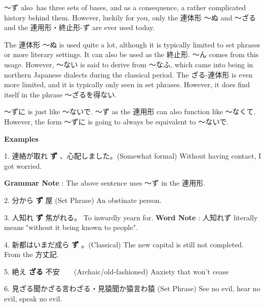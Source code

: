 \par{  ～ず also has three sets of bases, and as a consequence, a rather complicated history behind them. However, luckily for you, only the 連体形 ～ぬ and ～ざる and the 連用形・終止形-ず are ever used today. }

\par{ The 連体形 ～ぬ is used quite a lot, although it is typically limited to set phrases or more literary settings. It can also be used as the 終止形. ～ん comes from this usage. However, ～ない is said to derive from ～なふ, which came into being in northern Japanese dialects during the classical period. The ざる-連体形 is even more limited, and it is typically only seen in set phrases. However, it does find itself in the phrase ～ざるを得ない. }
 
\par{～ずに is just like ～ないで. ～ず as the 連用形 can also function like ～なくて. However, the form ～ずに is going to always be equivalent to ～ないで. }

\begin{center}
 \textbf{Examples }
\end{center}

\par{1. 連絡が取れ \textbf{ず }、心配しました。(Somewhat formal) \hfill\break
Without having contact, I got worried. }

\par{\textbf{Grammar Note }: The above sentence uses ～ず in the 連用形. }

\par{2. 分から \textbf{ず }屋 (Set Phrase) \hfill\break
An obstinate person. }

\par{3. 人知れ \textbf{ず }焦がれる。 \hfill\break
To inwardly yearn for. \hfill\break
\hfill\break
\textbf{Word Note }: 人知れず literally means "without it being known to people". }

\par{4. 新都はいまだ成ら \textbf{ず }。(Classical) \hfill\break
The new capital is still not completed. \hfill\break
From the 方丈記. }

\par{5. 絶え \textbf{ざる }不安     (Archaic\slash old-fashioned) \hfill\break
Anxiety that won't cease }

\par{6. 見ざる聞かざる言わざる・見猿聞か猿言わ猿 (Set Phrase) \hfill\break
See no evil, hear no evil, speak no evil. }

